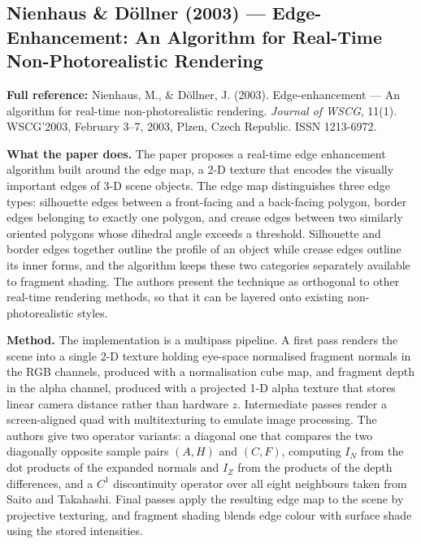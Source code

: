 \documentclass[11pt, a4paper]{article}
\begin{document}
\vspace{8pt}

\subsection{Nienhaus \& D\"{o}llner (2003) --- Edge-Enhancement: An Algorithm for Real-Time Non-Photorealistic Rendering}

\begin{refbox}
\textbf{Full reference:} Nienhaus, M., \& D\"{o}llner, J. (2003). Edge-enhancement --- An algorithm for real-time non-photorealistic rendering. \textit{Journal of WSCG}, 11(1). WSCG'2003, February 3--7, 2003, Plzen, Czech Republic. ISSN 1213-6972.
\end{refbox}

\textbf{What the paper does.} The paper proposes a real-time edge enhancement algorithm built around the edge map, a 2-D texture that encodes the visually important edges of 3-D scene objects. The edge map distinguishes three edge types: silhouette edges between a front-facing and a back-facing polygon, border edges belonging to exactly one polygon, and crease edges between two similarly oriented polygons whose dihedral angle exceeds a threshold. Silhouette and border edges together outline the profile of an object while crease edges outline its inner forms, and the algorithm keeps these two categories separately available to fragment shading. The authors present the technique as orthogonal to other real-time rendering methods, so that it can be layered onto existing non-photorealistic styles.

\textbf{Method.} The implementation is a multipass pipeline. A first pass renders the scene into a single 2-D texture holding eye-space normalised fragment normals in the RGB channels, produced with a normalisation cube map, and fragment depth in the alpha channel, produced with a projected 1-D alpha texture that stores linear camera distance rather than hardware $z$. Intermediate passes render a screen-aligned quad with multitexturing to emulate image processing. The authors give two operator variants: a diagonal one that compares the two diagonally opposite sample pairs $(A,H)$ and $(C,F)$, computing $I_N$ from the dot products of the expanded normals and $I_Z$ from the products of the depth differences, and a $C^1$ discontinuity operator over all eight neighbours taken from Saito and Takahashi. Final passes apply the resulting edge map to the scene by projective texturing, and fragment shading blends edge colour with surface shade using the stored intensities.
\end{document}
